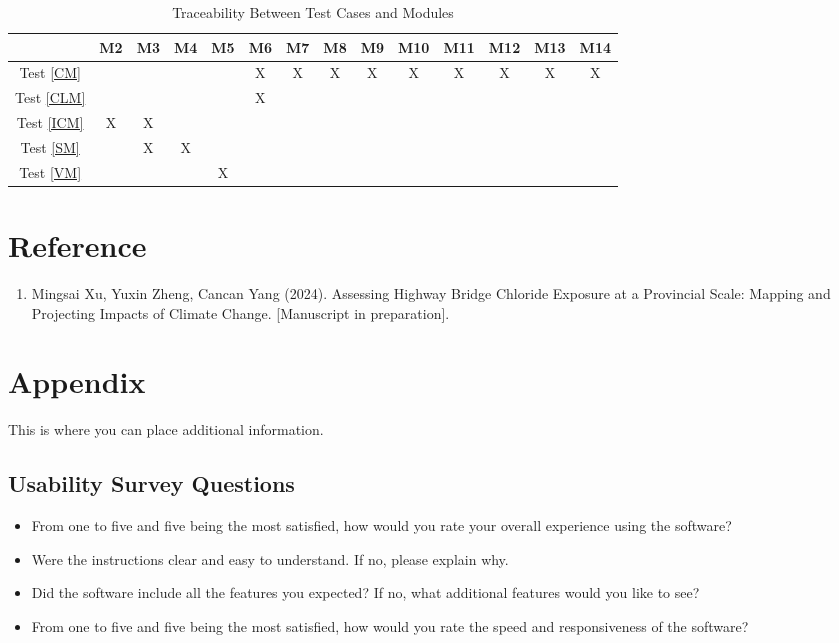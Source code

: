 \documentclass[12pt, titlepage]{article}
\newcounter{refnum} %
\begin{document}
\begin{table}[h]
\centering
\begin{tabular}{|c|c|c|c|c|c|c|c|c|c|c|c|c|c|}
\hline
	& M2 & M3 & M4  & M5 & M6 & M7 & M8 & M9 & M10 & M11 & M12 & M13 & M14 \\
\hline

Test \ref{CM}    & &  &  &  & X & X & X & X & X & X & X & X & X \\ \hline
Test \ref{CLM} &  &  &  &  & X  &  & &  &  &  &  &  & \\ \hline
Test \ref{ICM} & X & X &  &  &  &  & &  &  &  &  &  & \\ \hline
Test \ref{SM} & & X & X &  &  &  & &  &  &  &  &  & \\ \hline
Test \ref{VM} & &  &  & X &  &  & &  &  &  &  &  & \\ \hline

\end{tabular}
\caption{Traceability Between Test Cases and Modules}
\label{Table:test_modules}
\end{table}

				
%

%

\section*{Reference}
\begin{enumerate}
\item {} \label{ref1}
Mingsai Xu, Yuxin Zheng, Cancan Yang (2024). Assessing Highway Bridge Chloride Exposure at a Provincial Scale: Mapping and Projecting Impacts of Climate Change.  [Manuscript in preparation].

\end{enumerate}


\newpage

\section{Appendix}

This is where you can place additional information.

\subsection{Usability Survey Questions}\label{USQ}
\begin{itemize}
\item From one to five and five being the most satisfied, how would you rate your overall experience using the software?
\item Were the instructions clear and easy to understand. If no, please explain why.
\item Did the software include all the features you expected? If no, what additional features would you like to see?
\item From one to five and five being the most satisfied, how would you rate the speed and responsiveness of the software?
\end{itemize}
\end{document}
